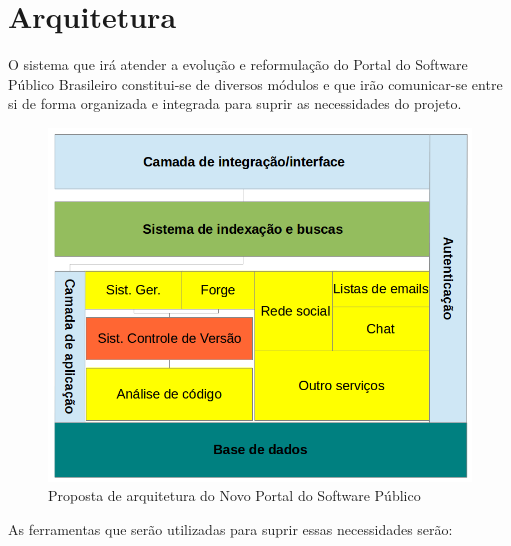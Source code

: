 \section{Arquitetura}
\label{sec:arquitetura}

O sistema que irá atender a evolução e reformulação do Portal do Software Público Brasileiro constitui-se de diversos módulos e que irão comunicar-se entre si de forma organizada e integrada para suprir as necessidades do projeto.
%

\begin{figure}[htpb]
  \begin{center}
    \includegraphics[width=.37\textwidth]{images/visao_arq.png}
  \end{center}
  \caption{Proposta de arquitetura do Novo Portal do Software Público}
  \label{fig:core_concurrent}
\end{figure}

As ferramentas que serão utilizadas para suprir essas necessidades serão:

